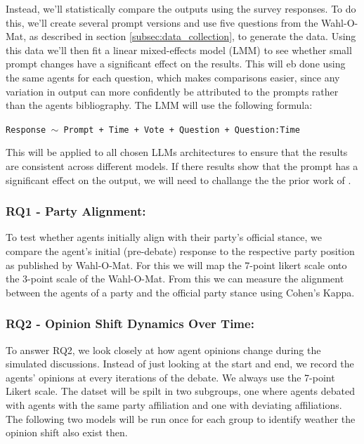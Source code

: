 \documentclass[12pt]{article}
\begin{document}
\begin{multicols}{2}
Instead, we'll statistically compare the outputs using the survey responses. To do this, we'll create several prompt versions and use five questions from the Wahl-O-Mat, as described in section \ref{subsec:data_collection}, to generate the data. Using this data we'll then fit a linear mixed-effects model (LMM) to see whether small prompt changes have a significant effect on the results. This will eb done using the same agents for each question, which makes comparisons easier, since any variation in output can more confidently be attributed to the prompts rather than the agents bibliography. The LMM will use the following formula:

\texttt{Response $\sim$ Prompt + Time + Vote + Question + Question:Time}

This will be applied to all chosen LLMs architectures to ensure that the results are consistent across different models. If there results show that the prompt has a significant effect on the output, we will need to challange the the prior work of .


\subsubsection{RQ1 - Party Alignment:}
To test whether agents initially align with their party's official stance, we compare the agent's initial (pre-debate) response to the respective party position as published by Wahl-O-Mat. For this we will map the 7-point likert scale onto the 3-point scale of the Wahl-O-Mat. From this we can measure the alignment between the agents of a party and the official party stance using Cohen's Kappa.



\subsubsection{RQ2 - Opinion Shift Dynamics Over Time:}
\label{subsubsex:RQ2}

To answer RQ2, we look closely at how agent opinions change during the simulated discussions. Instead of just looking at the start and end, we record the agents' opinions at every iterations of the debate. We always use the 7-point Likert scale. The datset will be spilt in two subgroups, one where agents debated with agents with the same party affiliation and one with deviating affiliations. The following two models will be run once for each group to identify weather the opinion shift also exist then.



\end{multicols}
\end{document}
